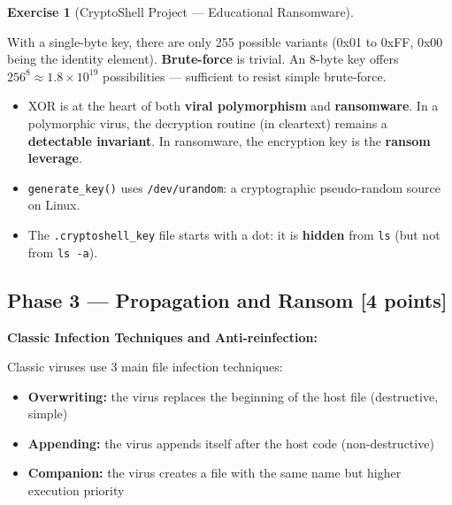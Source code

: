 \documentclass[a4paper,11pt]{article}
\theoremstyle{plain}
\theoremstyle{definition}
\newtheorem{exercice}{Exercise}
\begin{document}
\begin{exercice}[CryptoShell Project --- Educational Ransomware]
\begin{correction}
\begin{attention}
With a single-byte key, there are only 255 possible variants (0x01 to 0xFF, 0x00 being the identity element). \textbf{Brute-force} is trivial. An 8-byte key offers $256^8 \approx 1.8 \times 10^{19}$ possibilities --- sufficient to resist simple brute-force.
\end{attention}

\begin{pointcle}
\begin{itemize}
    \item XOR is at the heart of both \textbf{viral polymorphism} and \textbf{ransomware}. In a polymorphic virus, the decryption routine (in cleartext) remains a \textbf{detectable invariant}. In ransomware, the encryption key is the \textbf{ransom leverage}.
    \item \texttt{generate\_key()} uses \texttt{/dev/urandom}: a cryptographic pseudo-random source on Linux.
    \item The \texttt{.cryptoshell\_key} file starts with a dot: it is \textbf{hidden} from \texttt{ls} (but not from \texttt{ls -a}).
\end{itemize}
\end{pointcle}

\end{correction}



\subsection*{Phase 3 --- Propagation and Ransom \hfill \normalsize [4 points]}

\begin{rappel}
\textbf{Classic Infection Techniques and Anti-reinfection:}

Classic viruses use 3 main file infection techniques:
\begin{itemize}
    \item \textbf{Overwriting:} the virus replaces the beginning of the host file (destructive, simple)
    \item \textbf{Appending:} the virus appends itself after the host code (non-destructive)
    \item \textbf{Companion:} the virus creates a file with the same name but higher execution priority
\end{itemize}


\end{rappel}
\end{exercice}
\end{document}
